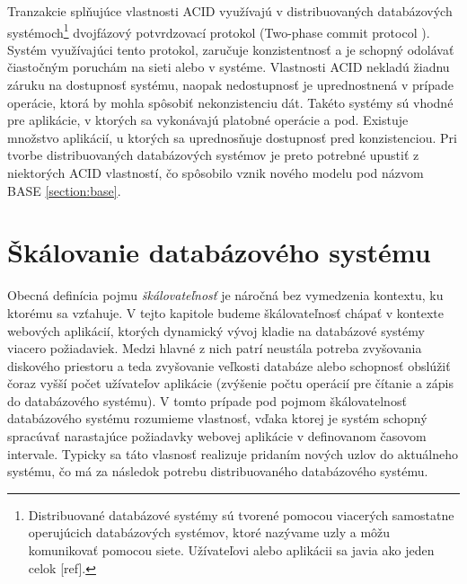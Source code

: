 \documentclass[11pt,twoside,a4paper]{book}
\begin{document}
Tranzakcie splňujúce vlastnosti ACID využívajú v distribuovaných databázových systémoch\footnote{Distribuované databázové systémy sú tvorené pomocou viacerých samostatne operujúcich databázových systémov, ktoré nazývame uzly a môžu komunikovať pomocou siete. Užívateľovi alebo aplikácii sa javia ako jeden celok [ref].} dvojfázový potvrdzovací protokol (Two-phase commit protocol \cite{bernstein1987concurrency}). Systém využívajúci tento protokol, zaručuje konzistentnosť a je schopný odolávať čiastočným poruchám na sieti alebo v systéme. Vlastnosti ACID nekladú žiadnu záruku na dostupnosť systému, naopak nedostupnosť je uprednostnená v prípade operácie, ktorá by mohla spôsobiť nekonzistenciu dát. Takéto systémy sú vhodné pre aplikácie, v ktorých sa vykonávajú platobné operácie a pod. Existuje množstvo aplikácií, u ktorých sa uprednosňuje dostupnosť pred konzistenciou. Pri tvorbe distribuovaných databázových systémov je preto potrebné upustiť z niektorých ACID vlastností, čo spôsobilo vznik nového modelu pod názvom BASE \ref{section:base}.


\section{Škálovanie databázového systému} %
Obecná definícia pojmu \emph{škálovateľnosť} \cite{bondi2000characteristics} je náročná  bez vymedzenia kontextu, ku ktorému sa vzťahuje. V tejto kapitole budeme škálovateľnosť chápať v kontexte webových aplikácií, ktorých dynamický vývoj kladie na databázové systémy viacero požiadaviek. Medzi hlavné z nich patrí neustála potreba zvyšovania diskového priestoru a teda zvyšovanie veľkosti databáze alebo schopnosť obslúžiť čoraz vyšší počet užívateľov aplikácie (zvýšenie počtu operácií pre čítanie a zápis do databázového systému). V tomto prípade pod pojmom škálovatelnosť databázového systému rozumieme vlastnosť, vďaka ktorej je systém schopný spracúvať narastajúce požiadavky webovej aplikácie v definovanom časovom intervale. Typicky sa táto vlasnosť realizuje pridaním nových uzlov do aktuálneho systému, čo má za následok potrebu distribuovaného databázového systému.
\end{document}
